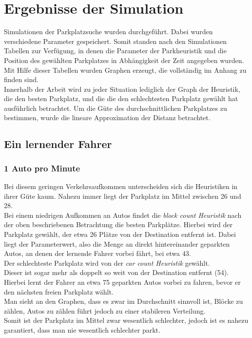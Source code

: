 \section{Ergebnisse der Simulation}

Simulationen der Parkplatzsuche wurden durchgeführt. Dabei wurden verschiedene Parameter gespeichert. Somit standen nach den Simulationen Tabellen zur Verfügung, in denen die Parameter der Parkheuristik und die Position des gewählten Parkplatzes in Abhängigkeit der Zeit angegeben wurden. \\
Mit Hilfe dieser Tabellen wurden Graphen erzeugt, die vollständig im Anhang zu finden sind.\\
Innerhalb der Arbeit wird zu jeder Situation lediglich der Graph der Heuristik, die den besten Parkplatz, und die die den schlechtesten Parkplatz gewählt hat ausführlich betrachtet. Um die Güte des durchschnittlichen Parkplatzes zu bestimmen, wurde die lineare Approximation der Distanz betrachtet. \\
\subsection{Ein lernender Fahrer}
\subsubsection{1 Auto pro Minute}

Bei diesem geringen Verkehrsaufkommen unterscheiden sich die Heuristiken in ihrer Güte kaum. Nahezu immer liegt der Parkplatz im Mittel zwischen 26 und 28.\\
Bei einem niedrigen Aufkommen an Autos findet die \emph{block count Heuristik} nach der oben beschriebenen Betrachtung die besten Parkplätze.
Hierbei wird der Parkplatz gewählt, der etwa 26  Plätze von der Destination entfernt ist. Dabei liegt der Parameterwert, also die Menge an direkt hintereinander geparkten Autos, an denen der lernende Fahrer vorbei fährt, bei etwa 43.\\
Der schlechteste Parkplatz wird von der \emph{car count Heuristik} gewählt. \\
Dieser ist sogar mehr als doppelt so weit von der Destination entfernt (54).
Hierbei lernt der Fahrer an etwa 75 geparkten Autos vorbei zu fahren, bevor er den nächsten freien Parkplatz wählt.\\
Man sieht an den Graphen, dass es zwar im Durchschnitt sinnvoll ist, Blöcke zu zählen, Autos zu zählen führt jedoch zu einer stabileren Verteilung.\\
Somit ist der Parkplatz im Mittel zwar wesentlich schlechter, jedoch ist es nahezu garantiert, dass man nie wesentlich schlechter parkt.

